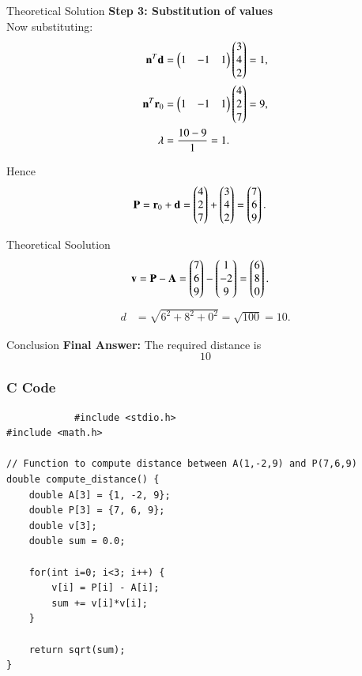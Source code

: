 \documentclass{beamer}
\begin{document}
\begin{frame}{Theoretical Solution}
\textbf{Step 3: Substitution of values} \\
Now substituting:
\begin{align}
    \mathbf{n}^T\mathbf{d} &= \begin{pmatrix}1 & -1 & 1\end{pmatrix}\begin{pmatrix}3 \\ 4 \\ 2\end{pmatrix} = 1, \\
    \mathbf{n}^T\mathbf{r}_0 &= \begin{pmatrix}1 & -1 & 1\end{pmatrix}\begin{pmatrix}4 \\ 2 \\ 7\end{pmatrix} = 9, \\
    \lambda &= \frac{10-9}{1} = 1.
\end{align}

Hence
\begin{align}
    \mathbf{P} &= \mathbf{r}_0 + \mathbf{d} = \begin{pmatrix}4 \\ 2 \\ 7\end{pmatrix} + \begin{pmatrix}3 \\ 4 \\ 2\end{pmatrix} = \begin{pmatrix}7 \\ 6 \\ 9\end{pmatrix}.
\end{align}
\end{frame}
\begin{frame}{Theoretical Soolution}
\begin{align}
    \mathbf{v} &= \mathbf{P} - \mathbf{A} = \begin{pmatrix}7 \\ 6 \\ 9\end{pmatrix} - \begin{pmatrix}1 \\ -2 \\ 9\end{pmatrix} = \begin{pmatrix}6 \\ 8 \\ 0\end{pmatrix}.
\end{align}
\begin{align}
    d &= \sqrt{6^2+8^2+0^2} = \sqrt{100} = 10.
\end{align}

\end{frame}
\begin{frame}{Conclusion}
\textbf{Final Answer: } The required distance is 
\[
\boxed{10}
\]
	\end{frame}
	
	\begin{frame}[fragile]
		\frametitle{C Code }
		
		\begin{lstlisting}
			#include <stdio.h>
#include <math.h>

// Function to compute distance between A(1,-2,9) and P(7,6,9)
double compute_distance() {
    double A[3] = {1, -2, 9};
    double P[3] = {7, 6, 9};
    double v[3];
    double sum = 0.0;

    for(int i=0; i<3; i++) {
        v[i] = P[i] - A[i];
        sum += v[i]*v[i];
    }

    return sqrt(sum);
}
				
			\end{lstlisting}
		\end{frame}
		
\end{document}
